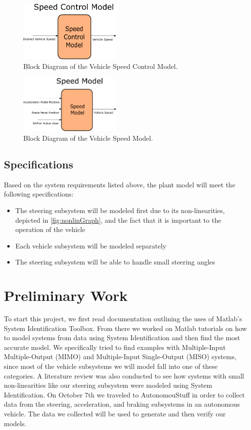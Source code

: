 \documentclass[letterpaper,12pt]{article}   %
\begin{document}
%
\begin{figure}
    \centering
    \captionsetup{justification=centering, margin=3cm}
    \includegraphics[width=2in]{figs/inkscape/speedControlModelArchitecture}
    \caption{Block Diagram of the Vehicle Speed Control Model.}
    \label{fig:cruiseBlockDiag}
\end{figure}
%
\begin{figure}
    \centering
    \captionsetup{justification=centering, margin=3cm}
    \includegraphics[width=2in]{figs/inkscape/speedModelArchitecture}
    \caption{Block Diagram of the Vehicle Speed Model.}
    \label{fig:speedBlockDiag}
\end{figure}


 \subsection{Specifications}
 Based on the system requirements listed above, the plant model will meet the following specifications:
 \begin{itemize}
    \item The steering subsystem will be modeled first due to its non-linearities, depicted in \autoref{fig:nonlinGraph}, and the fact that it is important to the operation of the vehicle
    \item Each vehicle subsystem will be modeled separately 
    \item The steering subsystem will be able to handle small steering angles
 \end{itemize}

\section{Preliminary Work}
To start this project, we first read documentation outlining the uses of Matlab's System Identification Toolbox. From there we worked on Matlab tutorials on how to model systems from data using System Identification and then find the most accurate model. We specifically tried to find examples with Multiple-Input Multiple-Output (MIMO) and Multiple-Input Single-Output (MISO) systems, since most of the vehicle subsystems we will model fall into one of these categories. A literature review was also conducted to see how systems with small non-linearities like our steering subsystem were modeled using System Identification. On October 7th we traveled to AutonomouStuff in order to collect data from the steering, acceleration, and braking subsystems in an autonomous vehicle. The data we collected will be used to generate and then verify our models. 
\end{document}
